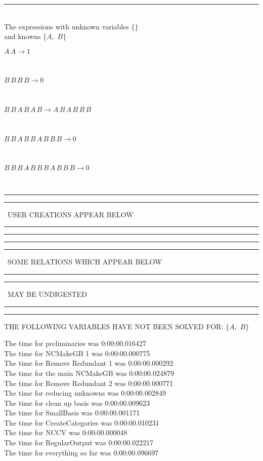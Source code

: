 \documentclass[rep10,leqno]{report}
\begin{document}
\rule[3pt]{6in}{.7pt}\\
The expressions with unknown variables $\{\}$\\
and knowns $\{A,
$ $
B\}$\smallskip\\
\begin{minipage}{6in}
$
A\,
 A\rightarrow 1
$
\end{minipage}\medskip \\
\begin{minipage}{6in}
$
B\,
 B\,
 B\,
 B\rightarrow 0
$
\end{minipage}\medskip \\
\begin{minipage}{6in}
$
B\,
 B\,
 A\,
 B\,
 A\,
 B\rightarrow A\,
 B\,
 A\,
 B\,
 B\,
 B
$
\end{minipage}\medskip \\
\begin{minipage}{6in}
$
B\,
 B\,
 A\,
 B\,
 B\,
 A\,
 B\,
 B\,
 B\rightarrow 0
$
\end{minipage}\medskip \\
\begin{minipage}{6in}
$
B\,
 B\,
 B\,
 A\,
 B\,
 B\,
 B\,
 A\,
 B\,
 B\,
 B\rightarrow 0
$
\end{minipage}\\
\rule[2pt]{6in}{1pt}\hfil\break
\rule[2.5pt]{1.701in}{1pt}
\ USER CREATIONS APPEAR BELOW\ 
\rule[2.5pt]{1.701in}{1pt}\hfil\break
\rule[2pt]{6in}{1pt}\hfil\break
\rule[2pt]{6in}{4pt}\hfil\break
\rule[2pt]{1.45in}{4pt}
\ SOME RELATIONS WHICH APPEAR BELOW\ 
\rule[2pt]{1.45in}{4pt}\hfil\break
\rule[2pt]{2.18in}{4pt}
\ MAY BE UNDIGESTED\ 
\rule[2pt]{2.18in}{4pt}\hfil\break
\rule[2pt]{6in}{4pt}\hfil\break
THE FOLLOWING VARIABLES HAVE NOT BEEN SOLVED FOR:\hfil\break
$\{A,
$ $
B\}$
\smallskip\\
\vspace{10pt}

\noindent
The time for preliminaries was 0:00:00.016427\\
The time for NCMakeGB 1 was 0:00:00.000775\\
The time for Remove Redundant 1 was 0:00:00.000292\\
The time for the main NCMakeGB was 0:00:00.024879\\
The time for Remove Redundant 2 was 0:00:00.000771\\
The time for reducing unknowns was 0:00:00.002849\\
The time for clean up basis was 0:00:00.009623\\
The time for SmallBasis was 0:00:00.001171\\
The time for CreateCategories was 0:00:00.010231\\
The time for NCCV was 0:00:00.000048\\
The time for RegularOutput was 0:00:00.022217\\
The time for everything so far was 0:00:00.096697\\
\end{document}
